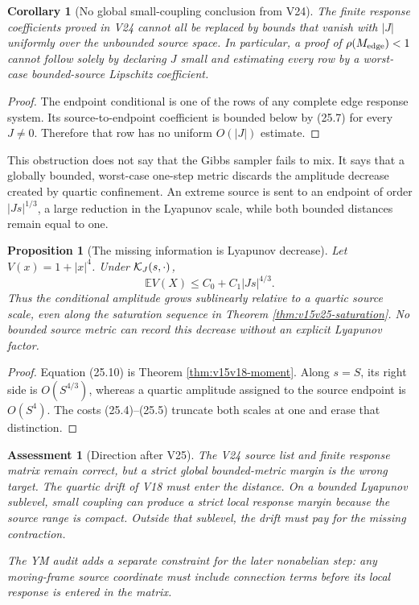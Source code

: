 \documentclass[11pt]{article}
\newtheorem{proposition}[theorem]{Proposition}
\newtheorem{corollary}[theorem]{Corollary}
\newtheorem{assessment}[theorem]{Assessment}
\theoremstyle{remark}
\begin{document}
\begin{corollary}[No global small-coupling conclusion from V24]
\label{cor:v15v25-no-small-j}
The finite response coefficients proved in V24 cannot all be
replaced by bounds that vanish with \(|J|\) uniformly over the
unbounded source space.  In particular, a proof of
\(\rho(M_{\rm edge})<1\) cannot follow solely by declaring \(J\)
small and estimating every row by a worst-case bounded-source
Lipschitz coefficient.
\end{corollary}

\begin{proof}
The endpoint conditional is one of the rows of any complete edge
response system.  Its source-to-endpoint coefficient is bounded
below by (25.7) for every \(J\ne0\).  Therefore that row has no
uniform \(O(|J|)\) estimate.
\end{proof}

This obstruction does not say that the Gibbs sampler fails to mix.
It says that a globally bounded, worst-case one-step metric discards
the amplitude decrease created by quartic confinement.  An
extreme source is sent to an endpoint of order \(|Js|^{1/3}\), a
large reduction in the Lyapunov scale, while both bounded distances
remain equal to one.

\begin{proposition}[The missing information is Lyapunov decrease]
\label{prop:v15v25-lyapunov}
Let \(V(x)=1+|x|^4\).  Under \({\cal K}_J(s,\cdot)\),
\[
 \mathbb E V(X)
 \le C_0+C_1|Js|^{4/3}.                                    \tag{25.10}
\]
Thus the conditional amplitude grows sublinearly relative to a
quartic source scale, even along the saturation sequence in
Theorem \ref{thm:v15v25-saturation}.  No bounded source metric can
record this decrease without an explicit Lyapunov factor.
\end{proposition}

\begin{proof}
Equation (25.10) is Theorem
\ref{thm:v15v18-moment}.  Along \(s=S\), its right side is
\(O(S^{4/3})\), whereas a quartic amplitude assigned to the source
endpoint is \(O(S^4)\).  The costs (25.4)--(25.5) truncate both
scales at one and erase that distinction.
\end{proof}

\begin{assessment}[Direction after V25]
\label{ass:v15v25-direction}
The V24 source list and finite response matrix remain correct, but a
strict global bounded-metric margin is the wrong target.  The
quartic drift of V18 must enter the distance.  On a bounded
Lyapunov sublevel, small coupling can produce a strict local
response margin because the source range is compact.  Outside that
sublevel, the drift must pay for the missing contraction.

The YM audit adds a separate constraint for the later nonabelian
step: any moving-frame source coordinate must include connection
terms before its local response is entered in the matrix.
\end{assessment}
\end{document}
